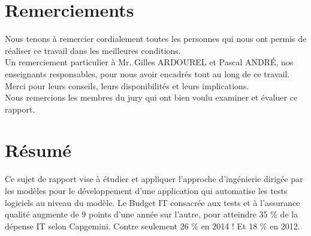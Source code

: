 \documentclass[
10pt, %
a4paper, %
oneside, %
headinclude,footinclude, %
BCOR5mm, %
]{report}
\begin{document}
	\pagestyle{scrheadings} %
								  
														
	\newpage
	\section*{Remerciements} 
	Nous tenons  à remercier cordialement toutes les personnes qui nous ont permis de réaliser ce travail dans les meilleures conditions.\\ 
														
	Un remerciement particulier à Mr. Gilles ARDOUREL et Pascal ANDRÉ, nos enseignants responsables, pour nous avoir encadrés tout au long de ce travail. Merci pour leurs conseils, leurs disponibilités et leurs implications. \\
														
	Nous remercions les membres du jury qui ont bien voulu examiner et évaluer ce rapport.
								
								  
	\newpage
	\section*{Résumé}
														
	Ce sujet de rapport vise à étudier et appliquer l'approche d'ingénierie dirigée par les modèles pour le développement d’une application qui automatise les tests  logiciels au niveau du modèle.
	Le Budget IT consacrée aux tests et à l’assurance qualité augmente de 9 points d’une année sur l’autre, pour atteindre 35 \% de la dépense IT selon Capgemini. Contre seulement 26 \% en 2014 ! Et 18 \% en 2012.
														
\end{document}
